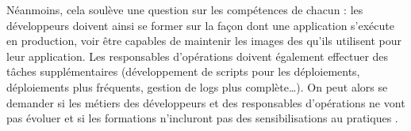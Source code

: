 Néanmoins, cela soulève une question sur les compétences de chacun : les développeurs doivent ainsi se former sur la façon dont une application s'exécute en production, voir être capables de maintenir les images des  qu'ils utilisent pour leur application. Les responsables d'opérations doivent également effectuer des tâches supplémentaires (développement de scripts pour les déploiements, déploiements plus fréquents, gestion de logs plus complète\ldots). On peut alors se demander si les métiers des développeurs et des responsables d'opérations ne vont pas évoluer et si les formations n'incluront pas des sensibilisations au pratiques \devops{}.
